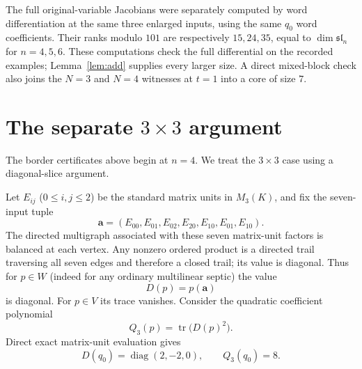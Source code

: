 \documentclass[11pt,reqno]{amsart}
\theoremstyle{definition}
\newcommand{\tr}{\operatorname{tr}}
\begin{document}
The full original-variable Jacobians were separately computed by word differentiation at the same three enlarged inputs, using the same $q_0$ word coefficients.  Their ranks modulo $101$ are respectively $15,24,35$, equal to $\dim\mathfrak{sl}_n$ for $n=4,5,6$.  These computations check the full differential on the recorded examples; Lemma~\ref{lem:add} supplies every larger size.  A direct mixed-block check also joins the $N=3$ and $N=4$ witnesses at $t=1$ into a core of size $7$.

\section{The separate \texorpdfstring{$3\times3$}{3-by-3} argument}\label{sec:m3}
The border certificates above begin at $n=4$.  We treat the $3\times3$ case using a diagonal-slice argument.

Let $E_{ij}$ ($0\le i,j\le2$) be the standard matrix units in $M_3(K)$, and fix the seven-input tuple
\begin{equation}\label{eq:frozen-tuple}
 \boldsymbol a=(E_{00},E_{01},E_{02},E_{20},E_{10},E_{01},E_{10}).
\end{equation}
The directed multigraph associated with these seven matrix-unit factors is balanced at each vertex.  Any nonzero ordered product is a directed trail traversing all seven edges and therefore a closed trail; its value is diagonal.  Thus for $p\in W$ (indeed for any ordinary multilinear septic) the value
\[
 D(p)=p(\boldsymbol a)
\]
is diagonal.  For $p\in V$ its trace vanishes.  Consider the quadratic coefficient polynomial
\begin{equation}\label{eq:Q3}
 Q_3(p)=\tr\bigl(D(p)^2\bigr).
\end{equation}
Direct exact matrix-unit evaluation gives
\begin{equation}\label{eq:diag-witness}
 D(q_0)=\operatorname{diag}(2,-2,0),\qquad Q_3(q_0)=8.
\end{equation}
\end{document}
